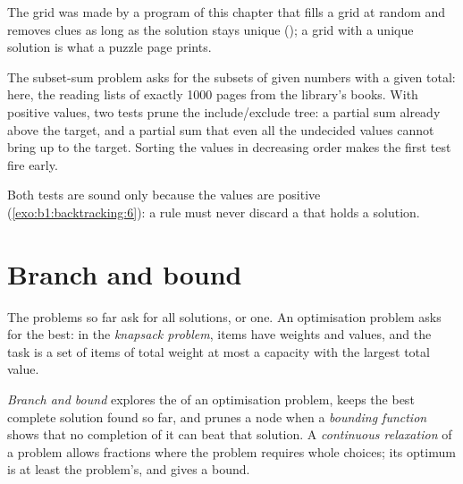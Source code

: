 The grid was made by a program of this chapter that fills a grid at random and removes clues as long as the solution
stays unique (); a grid with a unique solution is what a puzzle page prints.

\label{out:b1:backtracking:grid}

\label{out:b1:backtracking:sudoku}


The subset-sum problem asks for the subsets of given numbers with a given total: here, the reading lists of exactly 1000
pages from the library's books. With positive values, two tests prune the include/exclude tree: a partial sum already
above the target, and a partial sum that even all the undecided values cannot bring up to the target. Sorting the values
in decreasing order makes the first test fire early.

\label{lst:b1:backtracking:subset-sum}

\label{out:b1:backtracking:subset-sum}

Both tests are sound only because the values are positive (\cref{exo:b1:backtracking:6}): a  rule must never
discard a  that holds a solution.

\section{Branch and bound}\label{sec:b1:backtracking:bb}

The problems so far ask for all solutions, or one. An optimisation problem asks for the best: in the \emph{knapsack
problem}, items have weights and values, and the task is a set of items of total weight at most a capacity with the
largest total value.

\begin{definition}\label{def:b1:backtracking:branch-and-bound}
\emph{Branch and bound} explores the  of an optimisation problem, keeps
the best complete solution found so far, and prunes a node when a \emph{bounding function}
shows that no completion of it can beat that solution. A \emph{continuous relaxation} of a
problem allows fractions where the problem requires whole choices; its optimum is at least the problem's, and gives a
bound.
\end{definition}

